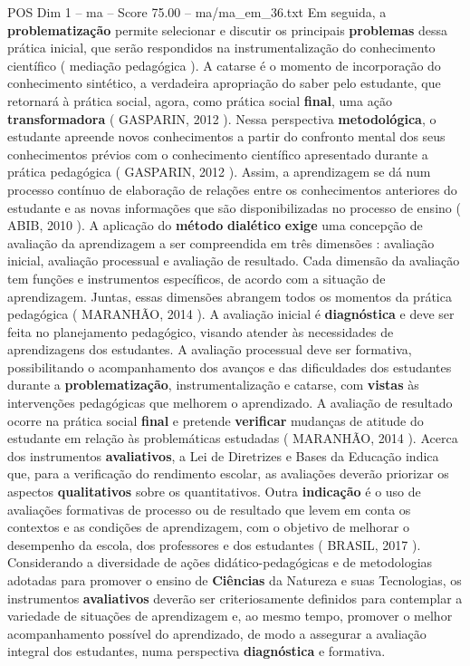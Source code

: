 \begin{textsample}{POS Dim 1 – ma – Score 75.00 – ma/ma\_em\_36.txt}
Em seguida, a \textbf{problematização} permite selecionar e discutir os principais \textbf{problemas} dessa prática inicial, que serão respondidos na instrumentalização do conhecimento científico ( mediação pedagógica ).
A catarse é o momento de incorporação do conhecimento sintético, a verdadeira apropriação do saber pelo estudante, que retornará à prática social, agora, como prática social \textbf{final}, uma ação \textbf{transformadora} ( GASPARIN, 2012 ).
Nessa perspectiva \textbf{metodológica}, o estudante apreende novos conhecimentos a partir do confronto mental dos seus conhecimentos prévios com o conhecimento científico apresentado durante a prática pedagógica ( GASPARIN, 2012 ).
Assim, a aprendizagem se dá num processo contínuo de elaboração de relações entre os conhecimentos anteriores do estudante e as novas informações que são disponibilizadas no processo de ensino ( ABIB, 2010 ).
A aplicação do \textbf{método} \textbf{dialético} \textbf{exige} uma concepção de avaliação da aprendizagem a ser compreendida em três dimensões : avaliação inicial, avaliação processual e avaliação de resultado.
Cada dimensão da avaliação tem funções e instrumentos específicos, de acordo com a situação de aprendizagem.
Juntas, essas dimensões abrangem todos os momentos da prática pedagógica ( MARANHÃO, 2014 ).
A avaliação inicial é \textbf{diagnóstica} e deve ser feita no planejamento pedagógico, visando atender às necessidades de aprendizagens dos estudantes.
A avaliação processual deve ser formativa, possibilitando o acompanhamento dos avanços e das dificuldades dos estudantes durante a \textbf{problematização}, instrumentalização e catarse, com \textbf{vistas} às intervenções pedagógicas que melhorem o aprendizado.
A avaliação de resultado ocorre na prática social \textbf{final} e pretende \textbf{verificar} mudanças de atitude do estudante em relação às problemáticas estudadas ( MARANHÃO, 2014 ).
Acerca dos instrumentos \textbf{avaliativos}, a Lei de Diretrizes e Bases da Educação indica que, para a verificação do rendimento escolar, as avaliações deverão priorizar os aspectos \textbf{qualitativos} sobre os quantitativos.
Outra \textbf{indicação} é o uso de avaliações formativas de processo ou de resultado que levem em conta os contextos e as condições de aprendizagem, com o objetivo de melhorar o desempenho da escola, dos professores e dos estudantes ( BRASIL, 2017 ).
Considerando a diversidade de ações didático-pedagógicas e de metodologias adotadas para promover o ensino de \textbf{Ciências} da Natureza e suas Tecnologias, os instrumentos \textbf{avaliativos} deverão ser criteriosamente definidos para contemplar a variedade de situações de aprendizagem e, ao mesmo tempo, promover o melhor acompanhamento possível do aprendizado, de modo a assegurar a avaliação integral dos estudantes, numa perspectiva \textbf{diagnóstica} e formativa.

\end{textsample}
